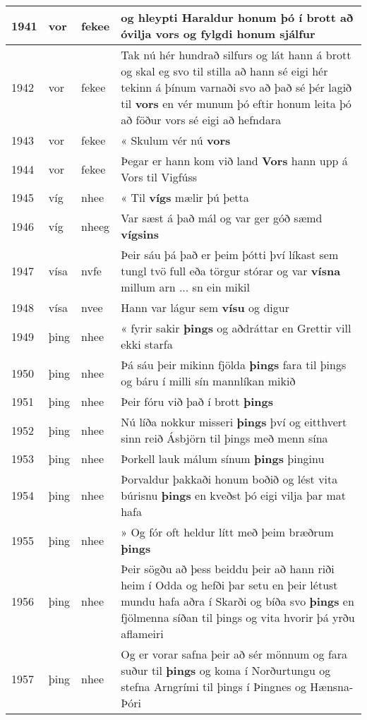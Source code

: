 \documentclass{article}
\begin{document}
\begin{longtable}{p{1cm}|p{1cm}|p{1cm}|p{13cm}}
\hline
1941&vor&fekee&og hleypti Haraldur honum þó í brott að óvilja \textbf{vors} og fylgdi honum sjálfur\\
\hline
1942&vor&fekee&Tak nú hér hundrað silfurs og lát hann á brott og skal eg svo til stilla að hann sé eigi hér tekinn á þínum varnaði svo að það sé þér lagið til \textbf{vors} en vér munum þó eftir honum leita þó að föður vors sé eigi að hefndara\\
\hline
1943&vor&fekee&« Skulum vér nú \textbf{vors} \\
\hline
1944&vor&fekee&Þegar er hann kom við land \textbf{Vors} hann upp á Vors til Vigfúss\\
\hline
1945&víg&nhee&« Til \textbf{vígs} mælir þú þetta\\
\hline
1946&víg&nheeg&Var sæst á það mál og var ger góð sæmd \textbf{vígsins} \\
\hline
1947&vísa&nvfe&Þeir sáu þá það er þeim þótti því líkast sem tungl tvö full eða törgur stórar og var \textbf{vísna} millum arn ... sn ein mikil\\
\hline
1948&vísa&nvee&Hann var lágur sem \textbf{vísu} og digur\\
\hline
1949&þing&nhee&« fyrir sakir \textbf{þings} og aðdráttar en Grettir vill ekki starfa\\
\hline
1950&þing&nhee&Þá sáu þeir mikinn fjölda \textbf{þings} fara til þings og báru í milli sín mannlíkan mikið\\
\hline
1951&þing&nhee&Þeir fóru við það í brott \textbf{þings} \\
\hline
1952&þing&nhee&Nú líða nokkur misseri \textbf{þings} því og eitthvert sinn reið Ásbjörn til þings með menn sína\\
\hline
1953&þing&nhee&Þorkell lauk málum sínum \textbf{þings} þinginu\\
\hline
1954&þing&nhee&Þorvaldur þakkaði honum boðið og lést vita búrisnu \textbf{þings} en kveðst þó eigi vilja þar mat hafa\\
\hline
1955&þing&nhee&» Og fór oft heldur lítt með þeim bræðrum \textbf{þings} \\
\hline
1956&þing&nhee&Þeir sögðu að þess beiddu þeir að hann riði heim í Odda og hefði þar setu en þeir létust mundu hafa aðra í Skarði og bíða svo \textbf{þings} en fjölmenna síðan til þings og vita hvorir þá yrðu aflameiri\\
\hline
1957&þing&nhee&Og er vorar safna þeir að sér mönnum og fara suður til \textbf{þings} og koma í Norðurtungu og stefna Arngrími til þings í Þingnes og Hænsna-Þóri\\

\end{longtable}
\end{document}
